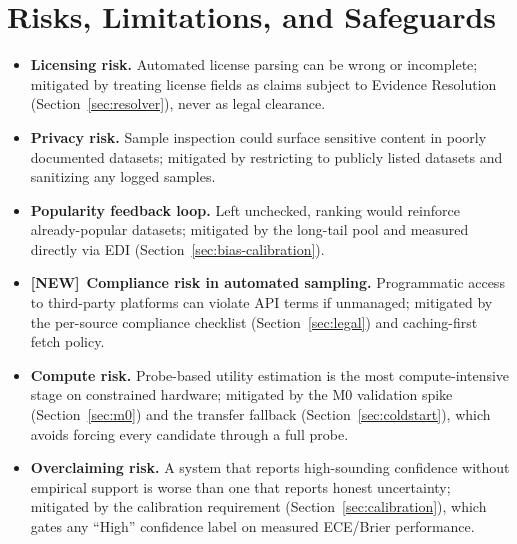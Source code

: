 \documentclass[11pt]{article}
\newcommand{\newtag}{\textcolor{accent}{\textbf{[NEW]}}\ }
\begin{document}
\section{Risks, Limitations, and Safeguards}
\begin{itemize}[leftmargin=*]
\item \textbf{Licensing risk.} Automated license parsing can be wrong or incomplete; mitigated by treating
      license fields as claims subject to Evidence Resolution (Section~\ref{sec:resolver}), never as
      legal clearance.
\item \textbf{Privacy risk.} Sample inspection could surface sensitive content in poorly documented
      datasets; mitigated by restricting to publicly listed datasets and sanitizing any logged samples.
\item \textbf{Popularity feedback loop.} Left unchecked, ranking would reinforce already-popular datasets;
      mitigated by the long-tail pool and measured directly via EDI (Section~\ref{sec:bias-calibration}).
\item \newtag \textbf{Compliance risk in automated sampling.} Programmatic access to third-party platforms
      can violate API terms if unmanaged; mitigated by the per-source compliance checklist
      (Section~\ref{sec:legal}) and caching-first fetch policy.
\item \textbf{Compute risk.} Probe-based utility estimation is the most compute-intensive stage on
      constrained hardware; mitigated by the M0 validation spike (Section~\ref{sec:m0}) and the transfer
      fallback (Section~\ref{sec:coldstart}), which avoids forcing every candidate through a full probe.
\item \textbf{Overclaiming risk.} A system that reports high-sounding confidence without empirical support
      is worse than one that reports honest uncertainty; mitigated by the calibration requirement
      (Section~\ref{sec:calibration}), which gates any ``High'' confidence label on measured ECE/Brier
      performance.
\end{itemize}

\end{document}
